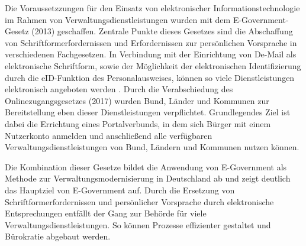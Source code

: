 Die Voraussetzzungen für den Einsatz von elektronischer Informationstechnologie im Rahmen von Verwaltungsdienstleistungen wurden mit dem E-Government-Gesetz (2013) geschaffen.
Zentrale Punkte dieses Gesetzes sind die Abschaffung von Schriftformerfordernissen und Erfordernissen zur persönlichen Vorsprache in verschiedenen Fachgesetzen.
In Verbindung mit der Einrichtung von De-Mail als elektronische Schriftform, sowie der Möglichkeit der elektronischen Identifizierung durch die eID-Funktion des Personalausweises, können so viele Dienstleistungen elektronisch angeboten werden \citep[][]{BMI2023}.
Durch die Verabschiedung des Onlinezugangsgesetzes (2017) wurden Bund, Länder und Kommunen zur Bereitstellung eben dieser Dienstleistungen verpflichtet.
Grundlegendes Ziel ist dabei die Errichtung eines Portalverbunds, in dem sich Bürger mit einem Nutzerkonto anmelden und anschließend alle verfügbaren Verwaltungsdienstleistungen von Bund, Ländern und Kommunen nutzen können.

Die Kombination dieser Gesetze bildet die Anwendung von E-Government als Methode zur Verwaltungsmodernisierung in Deutschland ab und zeigt deutlich das Hauptziel von E-Government auf.
Durch die Ersetzung von Schriftformerfordernissen und persönlicher Vorsprache durch elektronische Entsprechungen entfällt der Gang zur Behörde für viele Verwaltungsdienstleistungen.
So können Prozesse effizienter gestaltet und Bürokratie abgebaut werden.